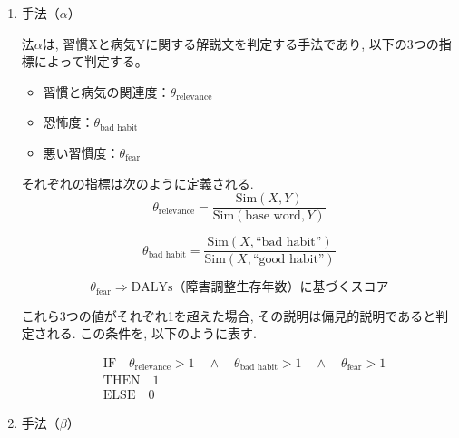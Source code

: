 \documentclass[dvipdfmx]{jsarticle}
\begin{document}
\begin{enumerate}
  \renewcommand{\labelenumi}{(\arabic{enumi})}
  \item 手法（$\alpha$）

        法$\alpha$は, 習慣Xと病気Yに関する解説文を判定する手法であり, 以下の3つの指標によって判定する。
        \vspace{1em}
        \begin{itemize}
          \item 習慣と病気の関連度：$\theta_{\text{relevance}}$
          \item 恐怖度：$\theta_{\text{bad~habit}}$
          \item 悪い習慣度：$\theta_{\text{fear}}$

        \end{itemize}
        \vspace{1em}

        それぞれの指標は次のように定義される.
        \begin{equation*}
          \theta_{\text{relevance}} = \frac{\text{Sim}(X, Y)}{\text{Sim}(\text{base word},Y)}
        \end{equation*}

        \begin{equation*}
          \theta_{\text{bad~habit}} = \frac{\text{Sim}(X, \text{``bad habit''})}{\text{Sim}(X, \text{``good habit''})}
        \end{equation*}

        \begin{equation*}
          \theta_{\text{fear}} \Rightarrow \text{DALYs（障害調整生存年数）に基づくスコア}
        \end{equation*}

        これら3つの値がそれぞれ1を超えた場合, その説明は偏見的説明であると判定される. この条件を, 以下のように表す.

        \begin{align*}
           & \text{IF} \quad \theta_{\text{relevance}} > 1 \quad \land \quad \theta_{\text{bad~habit}} > 1 \quad \land \quad \theta_{\text{fear}} > 1 \\
           & \text{THEN} \quad 1                                                                                                                      \\
           & \text{ELSE} \quad 0
        \end{align*}

  \item 手法（$\beta$）


\end{enumerate}
\end{document}
